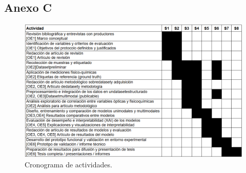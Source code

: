 \begin{landscape}
\chapter*{Anexo C}
\label{AnexoC}

\begin{figure}[th]
\centering
\includegraphics[scale=0.5]{Figures/cronograma.png}
\decoRule
\caption{Cronograma de actividades.}
\label{fig:cronograma}
\end{figure}
\end{landscape}